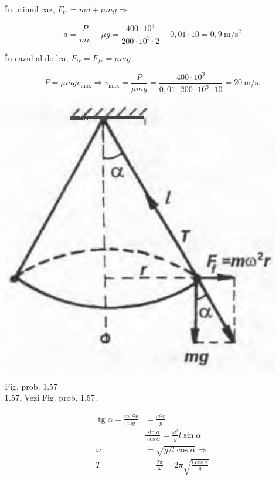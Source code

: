 \documentclass[10pt]{article}
\begin{document}
În primul caz, $F_{t r}=m a+\mu m g \Rightarrow$

$$
a=\frac{P}{m v}-\mu g=\frac{400 \cdot 10^{3}}{200 \cdot 10^{3} \cdot 2}-0,01 \cdot 10=0,9 \mathrm{~m} / \mathrm{s}^{2}
$$

În cazul al doilea, $F_{t r}=F_{f r}=\mu m g$

$$
P=\mu m g v_{\max } \Rightarrow v_{\max }=\frac{P}{\mu m g}=\frac{400 \cdot 10^{3}}{0,01 \cdot 200 \cdot 10^{3} \cdot 10}=20 \mathrm{~m} / \mathrm{s} .
$$

\begin{center}
\includegraphics[max width=\textwidth]{2025_07_01_5b3ff9fa0d508c8e9f17g-210}
\end{center}

Fig. prob. 1.57\\
1.57. Vezi Fig. prob. 1.57.

$$
\begin{aligned}
\operatorname{tg} \alpha=\frac{m \omega^{2} r}{m g} & =\frac{\omega^{2} r}{g} \\
& \frac{\sin \alpha}{\cos \alpha}=\frac{\omega^{2}}{g} l \sin \alpha \\
\omega & =\sqrt{g / l \cos \alpha} \Rightarrow \\
T & =\frac{2 \pi}{\omega}=2 \pi \sqrt{\frac{l \cos \alpha}{g}}
\end{aligned}
$$
\end{document}
